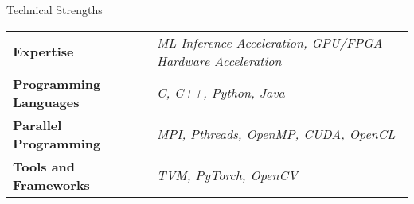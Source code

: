 \documentclass[
	11pt, %
]{./assets/resume} %
\begin{document}
	




\begin{rSection}{Technical Strengths}

	\def\arraystretch{1.5}

	\begin{tabular}{ l l}
		\textbf{Expertise} & \emph{ML Inference Acceleration, GPU/FPGA Hardware Acceleration} \\
		\textbf{Programming Languages} & \emph{C, C++, Python, Java} \\
            \textbf{Parallel Programming} & \emph{MPI, Pthreads, OpenMP, CUDA, OpenCL} \\
		\textbf{Tools and Frameworks} & \emph{TVM, PyTorch, OpenCV} \\ 
	\end{tabular}

\end{rSection}

\end{document}
